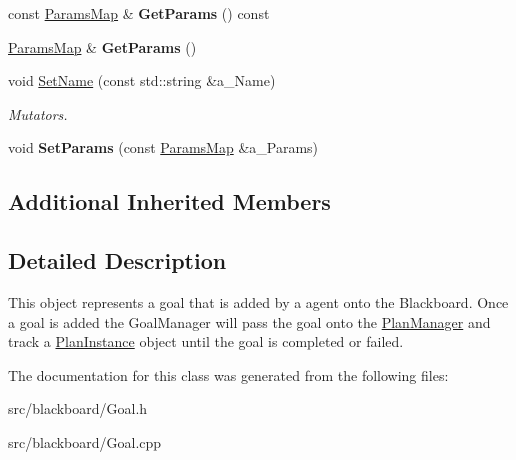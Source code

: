 \begin{DoxyCompactItemize}
\mbox{\label{class_goal_aa4f2805affa84db1dd3e7b0e2806fecc}} 
const \hyperlink{class_params_map}{Params\+Map} \& {\bfseries Get\+Params} () const
\item 
\mbox{\label{class_goal_aa12d8e975f52616e9f51fe7c1a4151ab}} 
\hyperlink{class_params_map}{Params\+Map} \& {\bfseries Get\+Params} ()
\item 
\mbox{\label{class_goal_ab9ef63d5c7740d055a878897a3d75851}} 
void \hyperlink{class_goal_ab9ef63d5c7740d055a878897a3d75851}{Set\+Name} (const std\+::string \&a\+\_\+\+Name)
\begin{DoxyCompactList}\small\item\em Mutators. \end{DoxyCompactList}\item 
\mbox{\label{class_goal_a570e141b2be345955ca13e674abed787}} 
void {\bfseries Set\+Params} (const \hyperlink{class_params_map}{Params\+Map} \&a\+\_\+\+Params)
\end{DoxyCompactItemize}
\subsection*{Additional Inherited Members}


\subsection{Detailed Description}
This object represents a goal that is added by a agent onto the Blackboard. Once a goal is added the Goal\+Manager will pass the goal onto the \hyperlink{class_plan_manager}{Plan\+Manager} and track a \hyperlink{class_plan_instance}{Plan\+Instance} object until the goal is completed or failed. 

The documentation for this class was generated from the following files\+:\begin{DoxyCompactItemize}
\item 
src/blackboard/Goal.\+h\item 
src/blackboard/Goal.\+cpp\end{DoxyCompactItemize}
